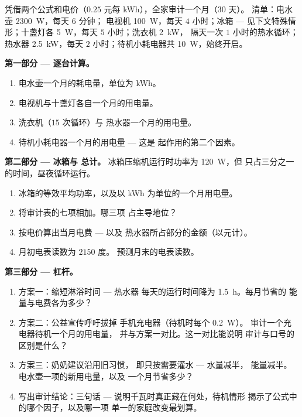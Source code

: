 \begin{problem}\label{pb:g9:electric-power-energy:1}
凭借两个公式和电价（$0.25$ 元每
\unit{kWh}），全家审计一个月（30 天）。
清单：电水壶 \qty{2300}{W}，每天 $6$ 分钟；
电视机 \qty{100}{W}，每天 $4$ 小时；冰箱 ---
见下文特殊情形；十盏灯各 \qty{5}{W}，每天
$5$ 小时；洗衣机 \qty{2}{kW}，
隔天一次 $1$ 小时的热水循环；热水器 \qty{2.5}{kW}，每天
$2$ 小时；待机小耗电器共 \qty{10}{W}，始终开启。

\medskip\noindent\textbf{第一部分 --- 逐台计算。}
\begin{enumerate}
  \item 电水壶一个月的耗电量，单位为 \unit{kWh}。
  \item 电视机与十盏灯各自一个月的用电量。
  \item 洗衣机（$15$ 次循环）与
        热水器一个月的用电量。
  \item 待机小耗电器一个月的用电量 --- 这是
        起作用的第二个因素。
\end{enumerate}

\medskip\noindent\textbf{第二部分 --- 冰箱与
总计。}
冰箱压缩机运行时功率为 \qty{120}{W}，但
只占三分之一的时间，昼夜循环运行。
\begin{enumerate}[resume]
  \item 冰箱的等效平均功率，以及以
        \unit{kWh} 为单位的一个月用电量。
  \item 将审计表的七项相加。哪三项
        占主导地位？
  \item 按电价算出当月电费 --- 以及
        热水器所占部分的金额（以元计）。
  \item 月初电表读数为 $2150$ 度。
        预测月末的电表读数。
\end{enumerate}

\medskip\noindent\textbf{第三部分 --- 杠杆。}
\begin{enumerate}[resume]
  \item 方案一：缩短淋浴时间 --- 热水器
        每天的运行时间降为 \qty{1.5}{h}。每月节省的
        能量与电费各为多少？
  \item 方案二：公益宣传呼吁拔掉
        手机充电器（待机时每个 \qty{0.2}{W}）。
        审计一个充电器待机一个月的用电量，
        并与方案一对比。这一对比能说明
        审计与口号的区别是什么？
  \item 方案三：奶奶建议沿用旧习惯，
        即只按需要灌水 --- 水量减半，
        能量减半。电水壶一项的新用电量，以及
        一个月节省多少？
  \item 写出审计结论：三句话 ---
        说明千瓦时真正藏在何处，待机情形
        揭示了公式中的哪个因子，以及哪一项
        单一的家庭改变最划算。
\end{enumerate}
\end{problem}
